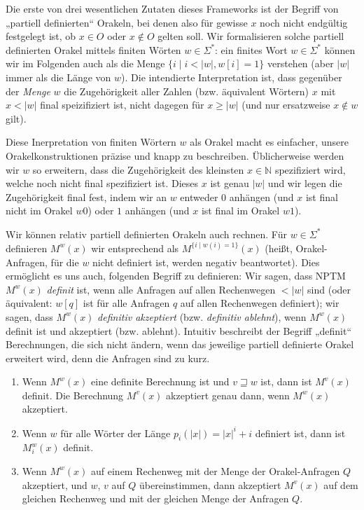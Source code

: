 Die erste von drei wesentlichen Zutaten dieses Frameworks ist der Begriff von „partiell definierten“ Orakeln, bei denen also für gewisse $x$ noch nicht endgültig festgelegt ist, ob $x\in O$ oder $x\not\in O$ gelten soll.
Wir formalisieren solche partiell definierten Orakel mittels finiten Wörten $w\in\Sigma^*$:
ein finites Wort $w\in\Sigma^*$ können wir im Folgenden auch als die Menge $\{ i \mid i<|w|, w[i] = 1 \}$ verstehen (aber $|w|$ immer als die Länge von $w$).
Die intendierte Interpretation ist, dass gegenüber der \emph{Menge} $w$ die Zugehörigkeit aller Zahlen (bzw. äquivalent Wörtern) $x$ mit $x<|w|$ final speizifiziert ist, nicht dagegen für $x\geq|w|$ (und nur ersatzweise $x\not\in w$ gilt).

Diese Inerpretation von finiten Wörtern $w$ als Orakel macht es einfacher, unsere Orakelkonstruktionen präzise und knapp zu beschreiben. Üblicherweise werden wir $w$ so erweitern, dass die Zugehörigkeit des kleinsten $x\in\mathbb N$ spezifiziert wird, welche noch nicht final spezifiziert ist. Dieses $x$ ist genau $|w|$ und wir legen die Zugehörigkeit final fest, indem wir an $w$ entweder $0$ anhängen (und $x$ ist final nicht im Orakel $w0$) oder $1$ anhängen (und $x$ ist final im Orakel $w1$).


Wir können relativ partiell definierten Orakeln auch rechnen. Für $w\in\Sigma^*$ definieren $M^w(x)$ wir entsprechend als $M^{\{i\mid w(i)=1\}}(x)$ (heißt, Orakel-Anfragen, für die $w$ nicht definiert ist, werden negativ beantwortet).
Dies ermöglicht es uns auch, folgenden Begriff zu definieren: Wir sagen, dass NPTM $M^w(x)$ \emph{definit} ist, wenn alle Anfragen auf allen Rechenwegen $<|w|$ sind (oder äquivalent: $w[q]$ ist für alle Anfragen $q$ auf allen Rechenwegen definiert); wir sagen, dass $M^w(x)$ \emph{definitiv akzeptiert} (bzw. \emph{definitiv ablehnt}), wenn $M^w(x)$ definit ist und akzeptiert (bzw. ablehnt). Intuitiv beschreibt der Begriff „definit“ Berechnungen, die sich nicht ändern, wenn das jeweilige partiell definierte Orakel erweitert wird, denn die Anfragen sind zu kurz.
\begin{observation}\label{obs:partialoracles}
    \begin{enumerate}
        \item Wenn $M^w(x)$ eine definite Berechnung ist und $v\sqsupseteq w$ ist, dann ist $M^v(x)$ definit. Die Berechnung $M^v(x)$ akzeptiert genau dann, wenn $M^w(x)$ akzeptiert.
        \item Wenn $w$ für alle Wörter der Länge $p_i(|x|)=|x|^i+i$ definiert ist, dann ist $M_i^w(x)$ definit.
        \item Wenn $M^w(x)$ auf einem Rechenweg mit der Menge der Orakel-Anfragen $Q$ akzeptiert, und $w$, $v$ auf $Q$ übereinstimmen, dann akzeptiert $M^v(x)$ auf dem gleichen Rechenweg und mit der gleichen Menge der Anfragen $Q$.
    \end{enumerate}
\end{observation}

